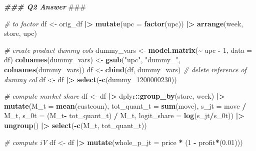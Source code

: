 \documentclass[
]{article}
\newenvironment{Shaded}{\begin{snugshade}}{\end{snugshade}}
\newcommand{\AlertTok}[1]{\textcolor[rgb]{0.94,0.16,0.16}{#1}}
\newcommand{\AttributeTok}[1]{\textcolor[rgb]{0.13,0.29,0.53}{#1}}
\newcommand{\CommentTok}[1]{\textcolor[rgb]{0.56,0.35,0.01}{\textit{#1}}}
\newcommand{\DecValTok}[1]{\textcolor[rgb]{0.00,0.00,0.81}{#1}}
\newcommand{\DocumentationTok}[1]{\textcolor[rgb]{0.56,0.35,0.01}{\textbf{\textit{#1}}}}
\newcommand{\FloatTok}[1]{\textcolor[rgb]{0.00,0.00,0.81}{#1}}
\newcommand{\FunctionTok}[1]{\textcolor[rgb]{0.13,0.29,0.53}{\textbf{#1}}}
\newcommand{\NormalTok}[1]{#1}
\newcommand{\OtherTok}[1]{\textcolor[rgb]{0.56,0.35,0.01}{#1}}
\newcommand{\SpecialCharTok}[1]{\textcolor[rgb]{0.81,0.36,0.00}{\textbf{#1}}}
\newcommand{\StringTok}[1]{\textcolor[rgb]{0.31,0.60,0.02}{#1}}
\begin{document}
\begin{Shaded}
\begin{Highlighting}[]
\DocumentationTok{\#\#\# Q2 Answer }\AlertTok{\#\#\#}

\CommentTok{\# to factor}
\NormalTok{df }\OtherTok{\textless{}{-}}\NormalTok{ orig\_df }\SpecialCharTok{|\textgreater{}}
  \FunctionTok{mutate}\NormalTok{(}\AttributeTok{upc =} \FunctionTok{factor}\NormalTok{(upc)) }\SpecialCharTok{|\textgreater{}}
  \FunctionTok{arrange}\NormalTok{(week, store, upc)}

\CommentTok{\# create product dummy cols}
\NormalTok{dummy\_vars }\OtherTok{\textless{}{-}} \FunctionTok{model.matrix}\NormalTok{(}\SpecialCharTok{\textasciitilde{}}\NormalTok{ upc }\SpecialCharTok{{-}} \DecValTok{1}\NormalTok{, }\AttributeTok{data =}\NormalTok{ df)}
\FunctionTok{colnames}\NormalTok{(dummy\_vars) }\OtherTok{\textless{}{-}} \FunctionTok{gsub}\NormalTok{(}\StringTok{"upc"}\NormalTok{, }\StringTok{"dummy\_"}\NormalTok{, }\FunctionTok{colnames}\NormalTok{(dummy\_vars))}
\NormalTok{df }\OtherTok{\textless{}{-}} \FunctionTok{cbind}\NormalTok{(df, dummy\_vars)}
\CommentTok{\# delete reference of dummy col}
\NormalTok{df }\OtherTok{\textless{}{-}}\NormalTok{ df }\SpecialCharTok{|\textgreater{}}  \FunctionTok{select}\NormalTok{(}\SpecialCharTok{{-}}\FunctionTok{c}\NormalTok{(dummy\_1200000230)) }

\CommentTok{\# compute market share}
\NormalTok{df }\OtherTok{\textless{}{-}}\NormalTok{ df }\SpecialCharTok{|\textgreater{}}
\NormalTok{  dplyr}\SpecialCharTok{::}\FunctionTok{group\_by}\NormalTok{(store, week) }\SpecialCharTok{|\textgreater{}}
  \FunctionTok{mutate}\NormalTok{(}\AttributeTok{M\_t =} \FunctionTok{mean}\NormalTok{(custcoun),}
         \AttributeTok{tot\_quant\_t =} \FunctionTok{sum}\NormalTok{(move),}
         \AttributeTok{s\_jt =}\NormalTok{ move }\SpecialCharTok{/}\NormalTok{ M\_t,}
         \AttributeTok{s\_0t =}\NormalTok{ (M\_t}\SpecialCharTok{{-}}\NormalTok{ tot\_quant\_t) }\SpecialCharTok{/}\NormalTok{ M\_t,}
         \AttributeTok{logit\_share =} \FunctionTok{log}\NormalTok{(s\_jt}\SpecialCharTok{/}\NormalTok{s\_0t)) }\SpecialCharTok{|\textgreater{}}
  \FunctionTok{ungroup}\NormalTok{() }\SpecialCharTok{|\textgreater{}}
  \FunctionTok{select}\NormalTok{(}\SpecialCharTok{{-}}\FunctionTok{c}\NormalTok{(M\_t, tot\_quant\_t))}

\CommentTok{\# compute iV}
\NormalTok{df }\OtherTok{\textless{}{-}}\NormalTok{ df }\SpecialCharTok{|\textgreater{}}
  \FunctionTok{mutate}\NormalTok{(}\AttributeTok{whole\_p\_jt =}\NormalTok{ price }\SpecialCharTok{*}\NormalTok{ (}\DecValTok{1} \SpecialCharTok{{-}}\NormalTok{ profit}\SpecialCharTok{*}\NormalTok{(}\FloatTok{0.01}\NormalTok{)))}


\end{Highlighting}
\end{Shaded}
\end{document}
